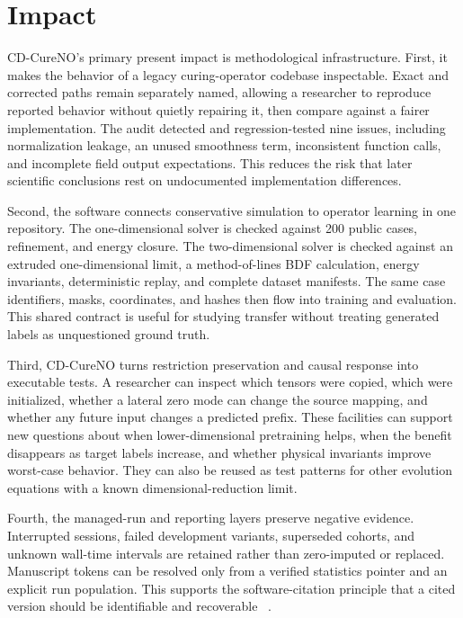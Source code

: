 \documentclass[preprint,12pt]{elsarticle}
\begin{document}
\section{Impact}

CD-CureNO's primary present impact is methodological infrastructure. First, it
makes the behavior of a legacy curing-operator codebase inspectable. Exact and
corrected paths remain separately named, allowing a researcher to reproduce
reported behavior without quietly repairing it, then compare against a fairer
implementation. The audit detected and regression-tested nine issues,
including normalization leakage, an unused smoothness term, inconsistent
function calls, and incomplete field output expectations. This reduces the
risk that later scientific conclusions rest on undocumented implementation
differences.

Second, the software connects conservative simulation to operator learning in
one repository. The one-dimensional solver is checked against 200 public
cases, refinement, and energy closure. The two-dimensional solver is checked
against an extruded one-dimensional limit, a method-of-lines BDF calculation,
energy invariants, deterministic replay, and complete dataset manifests. The
same case identifiers, masks, coordinates, and hashes then flow into training
and evaluation. This shared contract is useful for studying transfer without
treating generated labels as unquestioned ground truth.

Third, CD-CureNO turns restriction preservation and causal response into
executable tests. A researcher can inspect which tensors were copied, which
were initialized, whether a lateral zero mode can change the source mapping,
and whether any future input changes a predicted prefix. These facilities can
support new questions about when lower-dimensional pretraining helps, when the
benefit disappears as target labels increase, and whether physical invariants
improve worst-case behavior. They can also be reused as test patterns for
other evolution equations with a known dimensional-reduction limit.

Fourth, the managed-run and reporting layers preserve negative evidence.
Interrupted sessions, failed development variants, superseded cohorts, and
unknown wall-time intervals are retained rather than zero-imputed or replaced.
Manuscript tokens can be resolved only from a verified statistics pointer and
an explicit run population. This supports the software-citation principle
that a cited version should be identifiable and recoverable
~\cite{smith2016software}.
\end{document}

